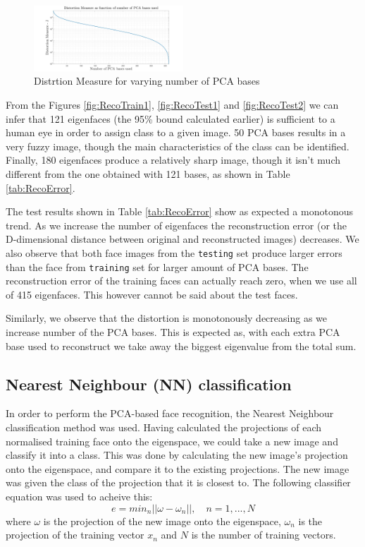 \documentclass[10pt,twocolumn,letterpaper]{article}
\begin{document}
\begin{figure}[H]
\begin{center}
  
    \includegraphics[width=0.5\textwidth]{../results/DistMeasure2}

  \caption{Distrtion Measure for varying number of PCA bases \label{fig:DistMeasure}}

\end{center}
\end{figure}
From the Figures \ref{fig:RecoTrain1},  \ref{fig:RecoTest1} and \ref{fig:RecoTest2} we can infer that 121 eigenfaces (the 95\% bound calculated earlier) is sufficient to a human eye in order to assign class to a given image. 50 PCA bases results in a very fuzzy image, though the main characteristics of the class can be identified. Finally, 180 eigenfaces produce a relatively sharp image, though it isn't much different from the one obtained with 121 bases, as shown in Table \ref{tab:RecoError}.

The test results shown in Table \ref{tab:RecoError} show as expected a monotonous trend. As we increase the number of eigenfaces the reconstruction error (or the D-dimensional distance between original and reconstructed images) decreases. We also observe that both face images from the {\tt\small testing} set produce larger errors than the face from {\tt\small training} set for larger amount of PCA bases. The reconstruction error of the training faces can actually reach zero, when we use all of 415 eigenfaces. This however cannot be said about the test faces.

Similarly, we observe that the distortion is monotonously decreasing as we increase number of the PCA bases. This is expected as, with each extra PCA base used to reconstruct we take away the biggest eigenvalue from the total sum.

\subsection{Nearest Neighbour (NN) classification}

In order to perform the PCA-based face recognition, the Nearest Neighbour classification method was used. Having calculated the projections of each normalised training face onto the eigenspace, we could take a new image and classify it into a class. This was done by calculating the new image's projection onto the eigenspace, and compare it to the existing projections. The new image was given the class of the projection that it is closest to. The following classifier equation was used to acheive this:
\begin{equation}
e = min_n ||\omega - \omega_n||,\quad n = 1,...,N
\end{equation}
where $\omega$ is the projection of the new image onto the eigenspace, $\omega_n$ is the projection of the training vector $x_n$ and $N$ is the number of training vectors.
\end{document}
